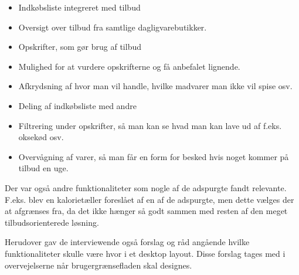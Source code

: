 \begin{itemize}
	\item Indkøbsliste integreret med tilbud
	\item Oversigt over tilbud fra samtlige dagligvarebutikker.
	\item Opskrifter, som gør brug af tilbud
	\item Mulighed for at vurdere opskrifterne og få anbefalet lignende.
	\item Afkrydsning af hvor man vil handle, hvilke madvarer man ikke vil spise osv.
	\item Deling af indkøbsliste med andre
	\item Filtrering under opskrifter, så man kan se hvad man kan lave ud af f.eks. oksekød osv.
	\item Overvågning af varer, så man får en form for besked hvis noget kommer på tilbud en uge.
\end{itemize}

Der var også andre funktionaliteter som nogle af de adspurgte fandt relevante.
F.eks. blev en kalorietæller foreslået af en af de adspurgte, men dette vælges der at afgrænses fra, da det ikke hænger så godt sammen med resten af den meget tilbudsorienterede løsning.

Herudover gav de interviewende også forslag og råd angående hvilke funktionaliteter skulle være hvor i et desktop layout. 
Disse forslag tages med i overvejelserne når brugergrænsefladen skal designes.
